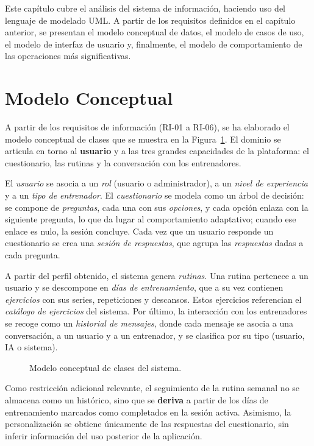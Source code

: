 Este capítulo cubre el análisis del sistema de información, haciendo uso del lenguaje de modelado UML. A partir de los requisitos definidos en el capítulo anterior, se presentan el modelo conceptual de datos, el modelo de casos de uso, el modelo de interfaz de usuario y, finalmente, el modelo de comportamiento de las operaciones más significativas.

\section{Modelo Conceptual}
A partir de los requisitos de información (RI-01 a RI-06), se ha elaborado el modelo conceptual de clases que se muestra en la Figura~\ref{fig:modelo-conceptual}. El dominio se articula en torno al \textbf{usuario} y a las tres grandes capacidades de la plataforma: el cuestionario, las rutinas y la conversación con los entrenadores.

El \textit{usuario} se asocia a un \textit{rol} (usuario o administrador), a un \textit{nivel de experiencia} y a un \textit{tipo de entrenador}. El \textit{cuestionario} se modela como un árbol de decisión: se compone de \textit{preguntas}, cada una con sus \textit{opciones}, y cada opción enlaza con la siguiente pregunta, lo que da lugar al comportamiento adaptativo; cuando ese enlace es nulo, la sesión concluye. Cada vez que un usuario responde un cuestionario se crea una \textit{sesión de respuestas}, que agrupa las \textit{respuestas} dadas a cada pregunta.

A partir del perfil obtenido, el sistema genera \textit{rutinas}. Una rutina pertenece a un usuario y se descompone en \textit{días de entrenamiento}, que a su vez contienen \textit{ejercicios} con sus series, repeticiones y descansos. Estos ejercicios referencian el \textit{catálogo de ejercicios} del sistema. Por último, la interacción con los entrenadores se recoge como un \textit{historial de mensajes}, donde cada mensaje se asocia a una conversación, a un usuario y a un entrenador, y se clasifica por su tipo (usuario, IA o sistema).

\begin{figure}[ht]
\centering
\caption{Modelo conceptual de clases del sistema.}
\label{fig:modelo-conceptual}
\end{figure}

Como restricción adicional relevante, el seguimiento de la rutina semanal no se almacena como un histórico, sino que se \textbf{deriva} a partir de los días de entrenamiento marcados como completados en la sesión activa. Asimismo, la personalización se obtiene únicamente de las respuestas del cuestionario, sin inferir información del uso posterior de la aplicación.

